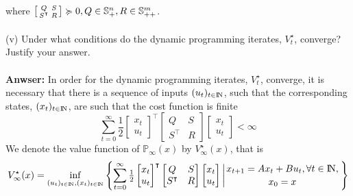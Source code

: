 \documentclass[a4paper,11pt,reqno]{amsart}
\newcommand{\N}{{\rm I\!N}}
\newcommand{\tran}{\intercal}
\begin{document}
where $\begin{bsmallmatrix}Q&S\\S^{\tran}&R\end{bsmallmatrix}\succcurlyeq 0, Q\in \mathbb{S}^n_+, R\in \mathbb{S}^m_{++}$.
\\ \\
(v) Under what conditions do the dynamic programming iterates, $V^{\star}_t$, converge? Justify your answer.
\\ \\
\textbf{Anwser:} In order for the dynamic programming iterates, $V^{\star}_t$, converge, it is necessary that there is a sequence of inputs $(u_t)_{t\in \N}$, such that the corresponding states, $(x_t)_{t\in \N}$, are such that the cost function is finite
\begin{equation}
    \sum_{t=0}^{\infty}\textstyle\frac{1}{2}
        \begin{bmatrix}
            x_t\\
            u_t
        \end{bmatrix}^{\tran}
        \begin{bmatrix}
            Q&S\\
            S^{\tran}&R
        \end{bmatrix}
        \begin{bmatrix}
            x_t\\
            u_t
        \end{bmatrix}
    <\infty
\end{equation}
We denote the value function of $\mathbb{P}_{\infty}(x)$ by $V_{\infty}^{\star}(x)$, that is
\begin{equation}
    V_{\infty}^{\star}(x)=\inf_{(u_t)_{t\in \N},(x_t)_{t\in \N}}
    \left\{
    \sum_{t=0}^{\infty}\tfrac{1}{2}
        \begin{bmatrix}
            x_t\\
            u_t
        \end{bmatrix}^{\tran}
        \begin{bmatrix}
            Q&S\\
            S^{\tran}&R
        \end{bmatrix}
        \begin{bmatrix}
            x_t\\
            u_t
        \end{bmatrix}
        \left\lvert
            x_{t+1}=Ax_t+Bu_t,\forall t\in\N,\atop
            x_0=x
        \right. 
    \right\} 
\end{equation}
\end{document}

